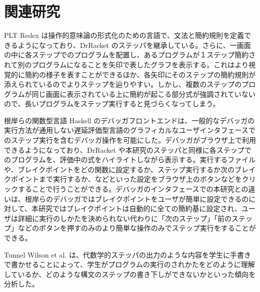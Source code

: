 \section{関連研究}

PLT Redex \cite{felleisen09}は操作的意味論の形式化のための言語で、文法と簡約規則を定義できるようになっており、DrRacket のステッパを継承している。さらに、一画面の中に各ステップでのプログラムを配置し、あるプログラムが１ステップ簡約されて別のプログラムになることを矢印で表したグラフを表示する。これはより視覚的に簡約の様子を表すことができるほか、各矢印にそのステップの簡約規則が添えられているのでよりステップを辿りやすい。しかし、複数のステップのプログラムが同じ画面に表示されている上に簡約が起こる部分式が強調されていないので、長いプログラムをステップ実行すると見づらくなってしまう。

根岸ら\cite{NI2009}の関数型言語 Haskell のデバッガフロントエンドは、一般的なデバッガの実行方法が通用しない遅延評価型言語のグラフィカルなユーザインタフェースでのステップ実行を含むデバッガ操作を可能にした。デバッガがブラウザ上で利用できるようになっており、DrRacket や本研究のステッパと同様に各ステップでのプログラムを、評価中の式をハイライトしながら表示する。実行するファイルや、ブレイクポイントをどの関数に設定するか、ステップ実行するか次のブレイクポイントまで実行するか、などといった設定をブラウザ上のボタンなどをクリックすることで行うことができる。デバッガのインタフェースでの本研究との違いは、根岸ら\cite{NI2009}のデバッガではブレイクポイントをユーザが簡単に設定できるのに対して、本研究ではブレイクポイントは自動的に全ての簡約基に設定され、ユーザは詳細に実行のしかたを決められない代わりに「次のステップ」「前のステップ」などのボタンを押すのみのより簡単な操作のみでステップ実行をすることができる。

Tunnel Wilson et al. \cite{tunnell18} は、代数学的ステッパの出力のような内容を学生に手書きで書かせることによって、学生がプログラムの実行のされかたをどのように理解しているか、どのような構文のステップの書き下しができないかといった傾向を分析した。
